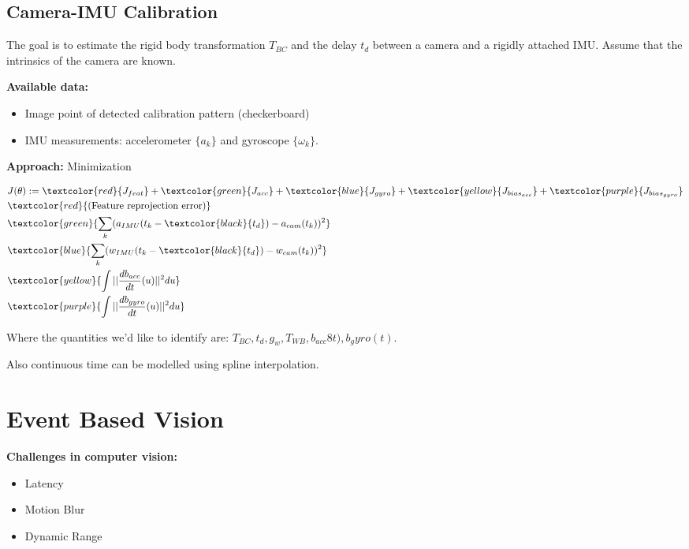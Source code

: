 \documentclass[10pt,a4paper]{scrartcl}
\begin{document}
\begin{multicols*}{2}
\subsection{Camera-IMU Calibration}

The goal is to estimate the rigid body transformation $T_{BC}$ and the delay $t_d$ between a camera and a rigidly attached IMU. Assume that the intrinsics of the camera are known.

\vspace{3ex}

\textbf{Available data:}
\begin{itemize}
\item Image point of detected calibration pattern (checkerboard)
\item IMU measurements: accelerometer $\{a_k\}$ and gyroscope $\{\omega_k\}$.
\end{itemize}

\textbf{Approach:} Minimization

\begin{align*}
&J(\theta):=\textcolor{red}{J_{feat}}+\textcolor{green}{J_{acc}}+\textcolor{blue}{J_{gyro}}+\textcolor{yellow}{J_{bias_{acc}}}+\textcolor{purple}{J_{bias_{gyro}}}\\
&\textcolor{red}{\text{(Feature reprojection error)}}\\
&\textcolor{green}{\sum\limits_k(a_{IMU}(t_k-\textcolor{black}{t_d})-a_{cam}(t_k))^2}\\
&\textcolor{blue}{\sum\limits_k(w_{IMU}(t_k-\textcolor{black}{t_d})-w_{cam}(t_k))^2}\\
&\textcolor{yellow}{\int||\frac{db_{acc}}{dt}(u)||^2du}\\
&\textcolor{purple}{\int||\frac{db_{gyro}}{dt}(u)||^2du}
\end{align*}

Where the quantities we'd like to identify are: $T_{BC},t_d,g_w,T_{WB},b_{acc}8t),b_gyro(t)$.

Also continuous time can be modelled using spline interpolation.

\section{Event Based Vision}

\textbf{Challenges in computer vision:}
\begin{itemize}
\item Latency
\item Motion Blur
\item Dynamic Range
\end{itemize}


\end{multicols*}
\end{document}
